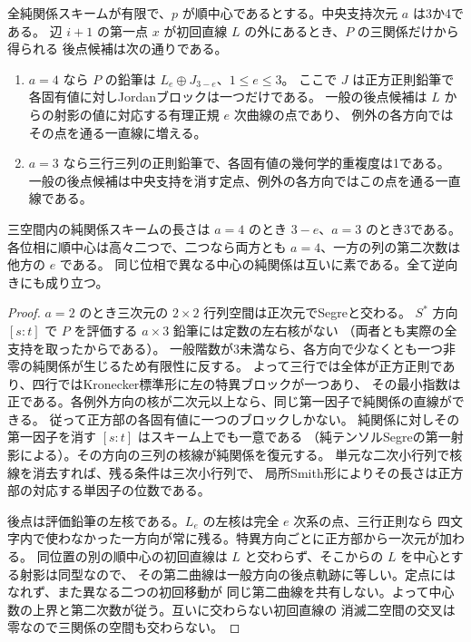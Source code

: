 \begin{proposition}\label{prop:finite-pure-pencil-opposite}
全純関係スキームが有限で、$p$ が順中心であるとする。中央支持次元 $a$ は3か4である。
辺 $i+1$ の第一点 $x$ が初回直線 $L$ の外にあるとき、$P$ の三関係だけから得られる
後点候補は次の通りである。
\begin{enumerate}
\item $a=4$ なら $P$ の鉛筆は $L_e\oplus J_{3-e}$、$1\le e\le3$。
ここで $J$ は正方正則鉛筆で各固有値に対しJordanブロックは一つだけである。
一般の後点候補は $L$ からの射影の値に対応する有理正規 $e$ 次曲線の点であり、
例外の各方向ではその点を通る一直線に増える。
\item $a=3$ なら三行三列の正則鉛筆で、各固有値の幾何学的重複度は1である。
一般の後点候補は中央支持を消す定点、例外の各方向ではこの点を通る一直線である。
\end{enumerate}
三空間内の純関係スキームの長さは $a=4$ のとき $3-e$、$a=3$ のとき3である。
各位相に順中心は高々二つで、二つなら両方とも $a=4$、一方の列の第二次数は他方の $e$ である。
同じ位相で異なる中心の純関係は互いに素である。全て逆向きにも成り立つ。
\end{proposition}
\begin{proof}
$a=2$ のとき三次元の $2\times2$ 行列空間は正次元でSegreと交わる。
$S^*$ 方向 $[s:t]$ で $P$ を評価する $a\times3$ 鉛筆には定数の左右核がない
（両者とも実際の全支持を取ったからである）。
一般階数が3未満なら、各方向で少なくとも一つ非零の純関係が生じるため有限性に反する。
よって三行では全体が正方正則であり、四行ではKronecker標準形に左の特異ブロックが一つあり、
その最小指数は正である。各例外方向の核が二次元以上なら、同じ第一因子で純関係の直線ができる。
従って正方部の各固有値に一つのブロックしかない。
純関係に対しその第一因子を消す $[s:t]$ はスキーム上でも一意である
（純テンソルSegreの第一射影による）。その方向の三列の核線が純関係を復元する。
単元な二次小行列で核線を消去すれば、残る条件は三次小行列で、
局所Smith形によりその長さは正方部の対応する単因子の位数である。

後点は評価鉛筆の左核である。$L_e$ の左核は完全 $e$ 次系の点、三行正則なら
四文字内で使わなかった一方向が常に残る。特異方向ごとに正方部から一次元が加わる。
同位置の別の順中心の初回直線は $L$ と交わらず、そこからの $L$ を中心とする射影は同型なので、
その第二曲線は一般方向の後点軌跡に等しい。定点にはなれず、また異なる二つの初回移動が
同じ第二曲線を共有しない。よって中心数の上界と第二次数が従う。互いに交わらない初回直線の
消滅二空間の交叉は零なので三関係の空間も交わらない。
\end{proof}


